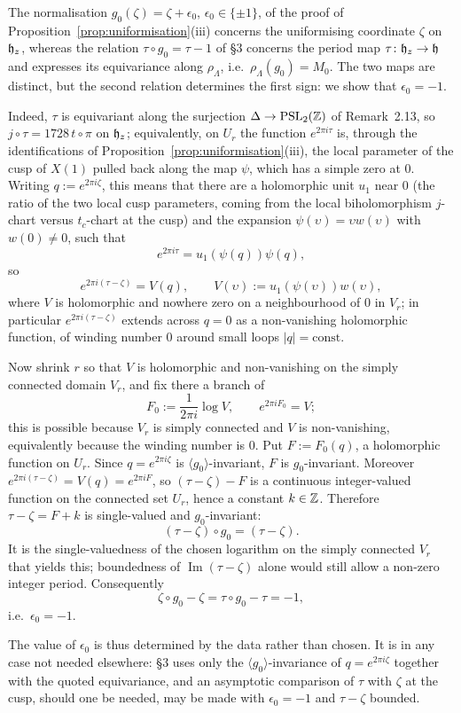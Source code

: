 \begin{remark}
The normalisation $g_0(\zeta) = \zeta+\epsilon_0$, $\epsilon_0 \in \{\pm1\}$, of the proof of Proposition~\ref{prop:uniformisation}(iii) concerns the uniformising coordinate $\zeta$ on $\mathfrak{h}_z$, whereas the relation $\tau \circ g_0 = \tau-1$ of \S3 concerns the period map $\tau\colon \mathfrak{h}_z \to \mathfrak{h}$ and expresses its equivariance along $\rho_\Lambda$, i.e.\ $\rho_\Lambda(g_0) = M_0$. The two maps are distinct, but the second relation determines the first sign: we show that $\epsilon_0 = -1$.

Indeed, $\tau$ is equivariant along the surjection $\Delta \to \mathrm{PSL}_2(\mathbb{Z})$ of Remark~2.13, so $j\circ\tau = 1728\,t\circ\pi$ on $\mathfrak{h}_z$; equivalently, on $U_r$ the function $e^{2\pi i\tau}$ is, through the identifications of Proposition~\ref{prop:uniformisation}(iii), the local parameter of the cusp of $X(1)$ pulled back along the map $\psi$, which has a simple zero at $0$. Writing $q := e^{2\pi i\zeta}$, this means that there are a holomorphic unit $u_1$ near $0$ (the ratio of the two local cusp parameters, coming from the local biholomorphism $j$-chart versus $t_c$-chart at the cusp) and the expansion $\psi(\upsilon) = \upsilon w(\upsilon)$ with $w(0) \ne 0$, such that
\[
e^{2\pi i\tau} = u_1(\psi(q)) \psi(q),
\]
so
\[
e^{2\pi i(\tau-\zeta)} = V(q), \qquad V(\upsilon) := u_1(\psi(\upsilon)) w(\upsilon),
\]
where $V$ is holomorphic and nowhere zero on a neighbourhood of $0$ in $V_r$; in particular $e^{2\pi i(\tau-\zeta)}$ extends across $q = 0$ as a non-vanishing holomorphic function, of winding number $0$ around small loops $|q| = \text{const}$.

Now shrink $r$ so that $V$ is holomorphic and non-vanishing on the simply connected domain $V_r$, and fix there a branch of
\[
F_0 := \frac{1}{2\pi i}\log V, \qquad e^{2\pi i F_0} = V;
\]
this is possible because $V_r$ is simply connected and $V$ is non-vanishing, equivalently because the winding number is $0$. Put $F := F_0(q)$, a holomorphic function on $U_r$. Since $q = e^{2\pi i\zeta}$ is $\langle g_0\rangle$-invariant, $F$ is $g_0$-invariant. Moreover $e^{2\pi i(\tau-\zeta)} = V(q) = e^{2\pi i F}$, so $(\tau-\zeta)-F$ is a continuous integer-valued function on the connected set $U_r$, hence a constant $k \in \mathbb{Z}$. Therefore $\tau-\zeta = F+k$ is single-valued and $g_0$-invariant:
\[
(\tau-\zeta)\circ g_0 = (\tau-\zeta).
\]
It is the single-valuedness of the chosen logarithm on the simply connected $V_r$ that yields this; boundedness of $\operatorname{Im}(\tau-\zeta)$ alone would still allow a non-zero integer period. Consequently
\[
\zeta\circ g_0 - \zeta = \tau\circ g_0 - \tau = -1,
\]
i.e.\ $\epsilon_0 = -1$.

The value of $\epsilon_0$ is thus determined by the data rather than chosen. It is in any case not needed elsewhere: \S3 uses only the $\langle g_0\rangle$-invariance of $q = e^{2\pi i\zeta}$ together with the quoted equivariance, and an asymptotic comparison of $\tau$ with $\zeta$ at the cusp, should one be needed, may be made with $\epsilon_0 = -1$ and $\tau-\zeta$ bounded.
\end{remark}

